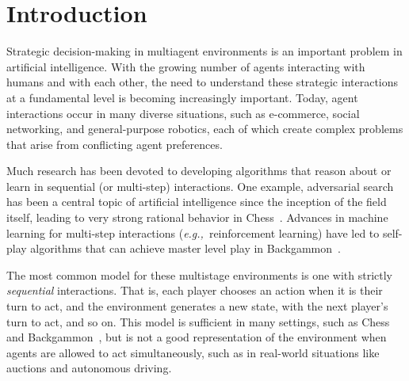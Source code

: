 \documentclass[preprint,12pt]{elsarticle}
\newcommand{\eg}{{\it e.g.,}~}
\begin{document}




\section{Introduction}
\label{sec:intro}

Strategic decision-making in multiagent environments is an important problem in artificial intelligence. 
With the growing number of agents interacting with humans and with each other, the need to 
understand these strategic interactions at a fundamental level is becoming increasingly important. 
Today, agent interactions occur in many diverse situations, such as e-commerce, social networking, and 
general-purpose robotics, each of which create complex problems that arise from conflicting agent 
preferences. 

Much research has been devoted to developing algorithms that reason about or learn in sequential (or multi-step) 
interactions. One example, adversarial search has been a central topic of artificial intelligence 
since the inception of the field itself, leading to very strong rational behavior in 
Chess~\cite{Campbell02deepblue}. Advances in machine learning for multi-step interactions 
(\eg reinforcement learning) have led to self-play algorithms that can achieve master level play 
in Backgammon~\cite{Tesauro95TDGammon}. 

The most common model for these multistage environments is one with strictly {\it sequential} 
interactions. That is, each player chooses an action when it is their turn to act, and the environment 
generates a new state, with the next player's turn to act, and so on. This model is sufficient in many 
settings, such as Chess and Backgammon~\cite{AIbook}, but is not a good representation of the environment when agents 
are allowed to act simultaneously, such as in real-world situations like auctions and autonomous driving. 
\end{document}

